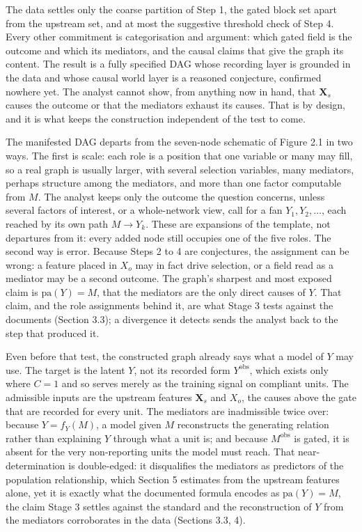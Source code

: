 The data settles only the coarse partition of Step 1, the gated block set apart from the upstream set, and at most the suggestive threshold check of Step 4. Every other commitment is categorisation and argument: which gated field is the outcome and which its mediators, and the causal claims that give the graph its content. The result is a fully specified DAG whose recording layer is grounded in the data and whose causal world layer is a reasoned conjecture, confirmed nowhere yet. The analyst cannot show, from anything now in hand, that $\mathbf{X}_s$ causes the outcome or that the mediators exhaust its causes. That is by design, and it is what keeps the construction independent of the test to come.

The manifested DAG departs from the seven-node schematic of Figure 2.1 in two ways. The first is scale: each role is a position that one variable or many may fill, so a real graph is usually larger, with several selection variables, many mediators, perhaps structure among the mediators, and more than one factor computable from $M$. The analyst keeps only the outcome the question concerns, unless several factors of interest, or a whole-network view, call for a fan $Y_1, Y_2, \ldots$, each reached by its own path $M \to Y_k$. These are expansions of the template, not departures from it: every added node still occupies one of the five roles. The second way is error. Because Steps 2 to 4 are conjectures, the assignment can be wrong: a feature placed in $X_o$ may in fact drive selection, or a field read as a mediator may be a second outcome. The graph's sharpest and most exposed claim is $\mathrm{pa}(Y) = M$, that the mediators are the only direct causes of $Y$. That claim, and the role assignments behind it, are what Stage 3 tests against the documents (Section 3.3); a divergence it detects sends the analyst back to the step that produced it.

Even before that test, the constructed graph already says what a model of $Y$ may use. The target is the latent $Y$, not its recorded form $Y^{\text{obs}}$, which exists only where $C = 1$ and so serves merely as the training signal on compliant units. The admissible inputs are the upstream features $\mathbf{X}_s$ and $X_o$, the causes above the gate that are recorded for every unit. The mediators are inadmissible twice over: because $Y = f_Y(M)$, a model given $M$ reconstructs the generating relation rather than explaining $Y$ through what a unit is; and because $M^{\text{obs}}$ is gated, it is absent for the very non-reporting units the model must reach. That near-determination is double-edged: it disqualifies the mediators as predictors of the population relationship, which Section 5 estimates from the upstream features alone, yet it is exactly what the documented formula encodes as $\mathrm{pa}(Y) = M$, the claim Stage 3 settles against the standard and the reconstruction of $Y$ from the mediators corroborates in the data (Sections 3.3, 4).

